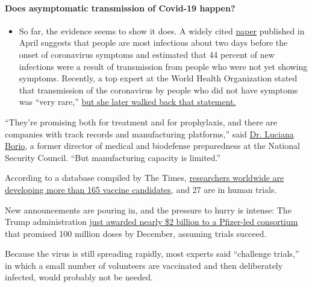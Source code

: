 \begin{itemize}
{  \paragraph{Does asymptomatic transmission of Covid-19
  happen?}\label{does-asymptomatic-transmission-of-covid-19-happen}}

  \begin{itemize}
  \tightlist
  \item
    So far, the evidence seems to show it does. A widely cited
    \href{https://www.nature.com/articles/s41591-020-0869-5}{paper}
    published in April suggests that people are most infectious about
    two days before the onset of coronavirus symptoms and estimated that
    44 percent of new infections were a result of transmission from
    people who were not yet showing symptoms. Recently, a top expert at
    the World Health Organization stated that transmission of the
    coronavirus by people who did not have symptoms was ``very rare,''
    \href{https://www.nytimes.com/2020/06/09/world/coronavirus-updates.html?action=click\&pgtype=Article\&state=default\&region=MAIN_CONTENT_3\&context=storylines_faq\#link-1f302e21}{but
    she later walked back that statement.}
  \end{itemize}
\end{itemize}

``They're promising both for treatment and for prophylaxis, and there
are companies with track records and manufacturing platforms,'' said
\href{http://leighbureau.com/speakers/lborio}{Dr. Luciana Borio}, a
former director of medical and biodefense preparedness at the National
Security Council. ``But manufacturing capacity is limited.''

According to a database compiled by The Times,
\href{https://www.nytimes.com/interactive/2020/science/coronavirus-vaccine-tracker.html}{researchers
worldwide are developing more than 165 vaccine candidates}, and 27 are
in human trials.

New announcements are pouring in, and the pressure to hurry is intense:
The Trump administration
\href{https://www.nytimes.com/2020/07/22/us/politics/pfizer-coronavirus-vaccine.html}{just
awarded nearly \$2 billion to a Pfizer-led consortium} that promised 100
million doses by December, assuming trials succeed.

Because the virus is still spreading rapidly, most experts said
``challenge trials,'' in which a small number of volunteers are
vaccinated and then deliberately infected, would probably not be needed.

